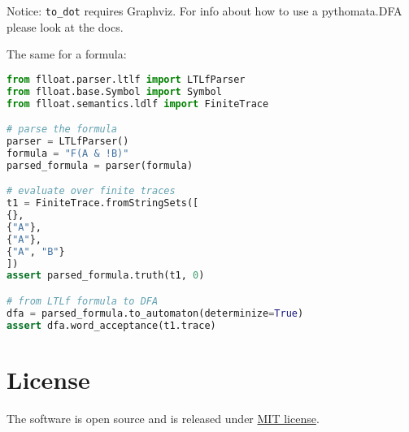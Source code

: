 Notice: \texttt{to\_dot} requires Graphviz. For info about how to use a pythomata.DFA please look at the docs.

The same for a \LTLf formula:

\begin{lstlisting}[language=Python, style=Python]
from flloat.parser.ltlf import LTLfParser
from flloat.base.Symbol import Symbol
from flloat.semantics.ldlf import FiniteTrace

# parse the formula
parser = LTLfParser()
formula = "F(A & !B)"
parsed_formula = parser(formula)

# evaluate over finite traces
t1 = FiniteTrace.fromStringSets([
{},
{"A"},
{"A"},
{"A", "B"}
])
assert parsed_formula.truth(t1, 0)

# from LTLf formula to DFA
dfa = parsed_formula.to_automaton(determinize=True)
assert dfa.word_acceptance(t1.trace)
\end{lstlisting}
 
\section{License}
The software is open source and is released under \href{https://github.com/MarcoFavorito/flloat/blob/master/LICENSE}{MIT license}.